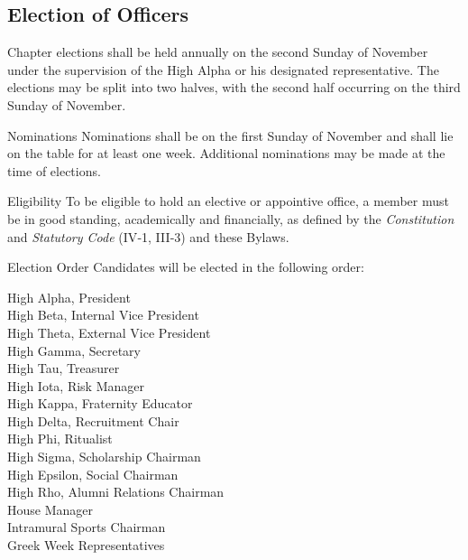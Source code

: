 \documentclass{article}
\begin{document}
\subsection{Election of Officers}

Chapter elections shall be held annually on the second Sunday of November under
the supervision of the High Alpha or his designated representative. The
elections may be split into two halves, with the second half occurring on the
third Sunday of November.

\begin{subsubsectionList}
  \item {\titleStyle Nominations\titleSuffix}
  Nominations shall be on the first Sunday of November and shall lie on the
  table for at least one week. Additional nominations may be made at the time of
  elections.

  \item {\titleStyle Eligibility\titleSuffix}
  To be eligible to hold an elective or appointive office, a member must be in
  good standing, academically and financially, as defined by the
  \emph{Constitution} and \emph{Statutory Code} (IV‑1, III‑3) and these Bylaws.

  \pagebreak

  \item {\titleStyle Election Order\titleSuffix}
  Candidates will be elected in the following order:
  \vspace*{-\parskip}
  \begin{adjustwidth}{}{}
  High Alpha, President\\
  High Beta, Internal Vice President\\
  High Theta, External Vice President\\
  High Gamma, Secretary\\
  High Tau, Treasurer\\
  High Iota, Risk Manager\\
  High Kappa, Fraternity Educator\\
  High Delta, Recruitment Chair\\
  High Phi, Ritualist\\
  High Sigma, Scholarship Chairman\\
  High Epsilon, Social Chairman\\
  High Rho, Alumni Relations Chairman\\
  House Manager\\
  Intramural Sports Chairman\\
  Greek Week Representatives
  \end{adjustwidth}


\end{subsubsectionList}
\end{document}
